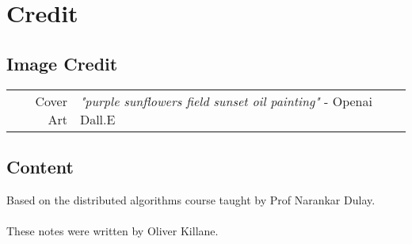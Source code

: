 \chapter{Credit}
\section*{Image Credit}
\begin{center}
	\begin{tabular}{r p{}}
		Cover Art & \textit{"purple sunflowers field sunset oil painting"} - Openai Dall.E \\
	\end{tabular}
\end{center}

\section*{Content}
Based on the distributed algorithms course taught by Prof Narankar Dulay.
\\
\\ These notes were written by Oliver Killane.
